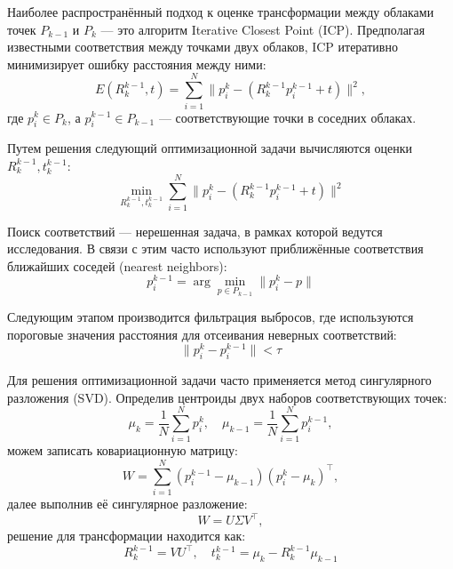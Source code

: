 Наиболее распространённый подход к оценке трансформации между облаками точек 
${P}_{k-1}$ и ${P}_k$ --- это алгоритм Iterative Closest Point (ICP).
Предполагая известными соответствия между точками двух облаков, 
ICP итеративно минимизирует ошибку расстояния между ними:
\begin{equation}
    E(R^{k-1}_k ,t) = \sum_{i=1}^{N}\|p_i^k - (R^{k-1}_k p_i^{k-1}+t)\|^2,
\end{equation}
где $p_i^k \in {P}_k$, а $p_i^{k-1} \in {P}_{k-1}$ --- соответствующие точки в соседних облаках.

Путем решения следующий оптимизационной задачи вычисляются оценки $R^{k-1}_k ,t^{k-1}_k$:
\begin{equation}
    \min_{R^{k-1}_k ,t^{k-1}_k}\sum_{i=1}^{N}\|p_i^k - (R^{k-1}_k p_i^{k-1}+t)\|^2
\end{equation}

Поиск соответствий --- нерешенная задача, в рамках которой ведутся исследования. 
В связи с этим часто используют приближённые соответствия ближайших соседей (nearest neighbors):
\begin{equation}
    p_i^{k-1} = \arg\min_{p \in {P}_{k-1}} \|p_i^k - p\|
\end{equation}

Следующим этапом производится фильтрация выбросов, где используются пороговые 
значения расстояния для отсеивания неверных соответствий:
\begin{equation}
    \|p_i^k - p_i^{k-1}\| < \tau
\end{equation}

Для решения оптимизационной задачи часто применяется метод сингулярного разложения (SVD). 
Определив центроиды двух наборов соответствующих точек:
\begin{equation}
    \mu_k = \frac{1}{N}\sum_{i=1}^{N}p_i^k, \quad \mu_{k-1} = \frac{1}{N}\sum_{i=1}^{N}p_i^{k-1},
\end{equation}
можем записать ковариационную матрицу:
\begin{equation}
    W = \sum_{i=1}^{N}(p_i^{k-1}-\mu_{k-1})(p_i^k-\mu_k)^\top,
\end{equation}
далее выполнив её сингулярное разложение:
\begin{equation}
    W = U\Sigma V^\top,
\end{equation}
решение для трансформации находится как:
\begin{equation}
    R^{k-1}_k = VU^\top, \quad t^{k-1}_k = \mu_k - R^{k-1}_k\mu_{k-1}
\end{equation}

